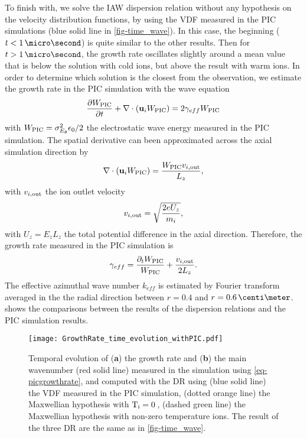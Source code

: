     To finish with, we solve the \ac{IAW} dispersion relation without any hypothesis on the velocity distribution functions, by using the VDF measured in the PIC simulations (blue solid line in  \cref{fig-time_wave}).
    In this case, the beginning ($t < 1 \,\micro\second$) is quite similar to the other results.
    Then for $t > 1 \,\micro\second$, the growth rate oscillates slightly around a mean value that is below the solution with cold ions, but above the result with warm ions.
    In order to determine which solution is the closest from the observation, we estimate the growth rate in the \ac{PIC} simulation with the wave equation
    \begin{equation} \label{eq-wequationbis}
      \frac{\partial W_{\rm PIC}}{\partial t} + \nabla \cdot ({\mathbf u_i} W_{\rm PIC}) = 2 \gamma_{eff} W_{\rm PIC}
    \end{equation}
    with $W_{\rm PIC} = \sigma_{E_{\theta}}^2 \epsilon_0/2$ the electrostatic wave energy measured in the \ac{PIC} simulation.
    The spatial derivative can been approximated across the axial simulation direction by
    \begin{equation} \label{eq-}
      \nabla \cdot ({\mathbf u_i} W_{\rm PIC}) = \frac{ W_{\rm PIC}  v_{i, \rm out} }{L_z},
    \end{equation}
    with $ v_{i, \rm out} $ the ion outlet velocity 
    \begin{equation} \label{eq-vout}
       v_{i, \rm out}  = \sqrt{\frac{2 e U_z}{m_i}},
    \end{equation}
    with $U_z = E_z L_z$ the total potential difference in the axial direction.
    Therefore, the growth rate measured in the \ac{PIC} simulation is
    \begin{equation} \label{eq-picgrowthrate}
      \gamma_{eff} = \frac{ \partial_t W_{\rm PIC} }{W_{\rm PIC}}  +\frac{  v_{i, \rm out} }{2 L_z}.
    \end{equation}
    The effective azimuthal wave number $k_{eff}$ is estimated by Fourier transform averaged in the the radial direction between $r=0.4$ and $r=0.6\,\centi\meter$.
     shows the comparisons between the results of the dispersion relations and the PIC simulation results.

    
    \begin{figure}[hbtp]
      \centering
      \texttt{[image: GrowthRate\_time\_evolution\_withPIC.pdf]}

      \caption{Temporal evolution of ({\bf a}) the growth rate and ({\bf b}) the main wavenumber  (red solid line) measured in the simulation using \cref{eq-picgrowthrate}, and computed with the DR using (blue solid line) the VDF measured in the PIC simulation, (dotted orange line) the Maxwellian hypothesis with $\mathrm{T_i}=0$\,\volt, (dashed green line) the Maxwellian hypothesis with non-zero temperature ions. The result of the three DR are the same as in \cref{fig-time_wave}. }
      \label{fig-pic_growth_rate}
    \end{figure}
    
